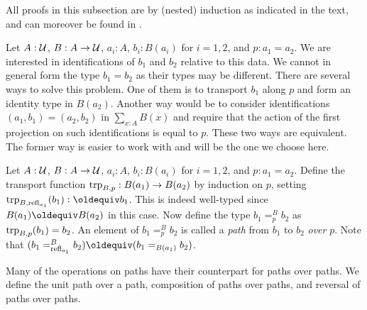 \documentclass[a4paper,12pt]{amsart}
\begin{document}
All proofs in this subsection are by (nested) induction as indicated in the text,
and can moreover be found in \cite[\href{https://github.com/UniMath/UniMath/blob/master/UniMath/MoreFoundations/PathsOver.v}{PathsOver.v}]{paths-over-formalized}.

Let $A : \mathcal{U}$, $B : A \to \mathcal{U}$, $a_i:A$, $b_i:B(a_i)$ for $i=1,2$, and $p : a_1 = a_2$.
We are interested in identifications of $b_1$ and $b_2$ relative to this data.
We cannot in general form the type $b_1 = b_2$ as their types may be different.
There are several ways to solve this problem. One of them is to transport $b_1$ along
$p$ and form an identity type in $B(a_2)$. Another way would be to consider
identifications $(a_1,b_1) = (a_2,b_2)$ in $\sum_{x:A} B(x)$ and require that the
action of the first projection on such identifications is equal to $p$.
These two ways are equivalent.
The former way is easier to work with and will be the one we choose here.

\begin{definition}\label{def:pathover}
Let $A : \mathcal{U}$, $B : A \to \mathcal{U}$, $a_i:A$, $b_i:B(a_i)$ for $i=1,2$, and $p : a_1 = a_2$.
Define the transport function $\mathop{\mathrm{trp}_{B,p}} : B(a_1)\to B(a_2)$ by induction on $p$,
setting $\trp{B,\refl{a_1}}(b_1)\defeq b_1$. This is indeed well-typed since
$B(a_1)\jdeq B(a_2)$ in this case.
Now define the type $b_1 =^B_p b_2$ as $\mathop{\mathrm{trp}_{B,p}}(b_1) = b_2$.
An element of $b_1 =^B_p b_2$ is called
a \emph{path} from $b_1$ to $b_2$ \emph{over} $p$.
Note that $(b_1 =^B_{\refl{a_1}} b_2) \jdeq (b_1 =_{B(a_1)}  b_2)$.
\end{definition}

Many of the operations on paths have their counterpart for paths over paths.
We define the unit path over a path, composition of paths over paths, and reversal of paths over paths.
\end{document}

